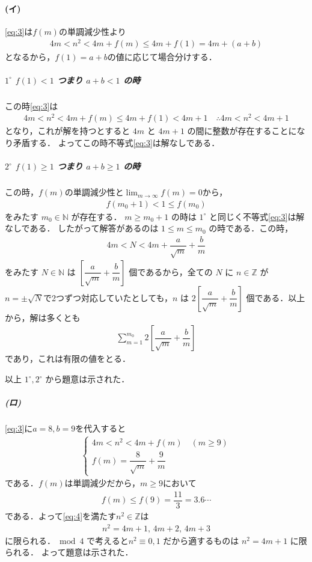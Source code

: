 \documentclass[../../main.tex]{subfiles}
\begin{document}
\paragraph{(イ)}

\cref{eq:3}は$f(m)$の単調減少性より
\begin{align}
  4m < n^2 < 4m + f(m) \le 4m + f(1) =4m+(a+b)
\end{align}
となるから，$f(1)=a+b$の値に応じて場合分けする．

\subparagraph{$1^\circ$ $f(1)<1$ つまり $a+b < 1$ の時}

この時\cref{eq:3}は
\begin{align}
  4m < n^2 < 4m + f(m) \le 4m + f(1) < 4m+1
  \quad\therefore
  4m < n^2 < 4m+1
\end{align}
となり，これが解を持つとすると $4m$ と $4m+1$ の間に整数が存在することになり矛盾する．
よってこの時不等式\cref{eq:3}は解なしである．

\subparagraph{$2^\circ$ $f(1)\ge 1$ つまり $a+b \ge 1$ の時}

この時，$f(m)$の単調減少性と$\lim_{m\to\infty}f(m)=0$から，
\begin{align}
  f(m_0+1) < 1 \le f(m_0)
\end{align}
をみたす $m_0 \in \mathbb{N}$ が存在する．
$m \ge m_0+1$ の時は $1^\circ$ と同じく不等式\cref{eq:3}は解なしである．
したがって解答があるのは $1 \le m \le m_0$ の時である．この時，
\begin{align}
  4m < N < 4m + \dfrac{a}{\sqrt{m}} + \dfrac{b}{m}
\end{align}
をみたす $N \in \mathbb{N}$ は $\left[ \dfrac{a}{\sqrt{m}} + \dfrac{b}{m} \right]$ 個であるから，全ての $N$ に $n \in \mathbb{Z}$ が $n=\pm\sqrt{N}$で2つずつ対応していたとしても，$n$ は $2 \left[ \dfrac{a}{\sqrt{m}} + \dfrac{b}{m} \right]$ 個である．以上から，解は多くとも
\begin{align}
  \sum_{m=1}^{m_0} 2 \left[ \dfrac{a}{\sqrt{m}} + \dfrac{b}{m} \right]
\end{align}
であり，これは有限の値をとる．
\casesend

以上 $1^\circ, 2^\circ$ から題意は示された．

\subparagraph{(ロ)}

\cref{eq:3}に$a=8,b=9$を代入すると
\begin{align}
  \begin{cases}
    4m < n^2 < 4m + f(m) \quad (m \ge 9)\\
    f(m) = \dfrac{8}{\sqrt{m}} + \dfrac{9}{m}
  \end{cases} \label{eq:4}
\end{align}
である．$f(m)$は単調減少だから，$m \ge 9$において
\begin{align}
  f(m) \le f(9) = \dfrac{11}{3} = 3.6\cdots
\end{align}
である．よって\cref{eq:4}を満たす$n^2 \in\mathbb{Z}$は
\begin{align}
  n^2 = 4m+1, \, 4m+2, \, 4m+3
\end{align}
に限られる．$\bmod 4$ で考えると$n^2 \equiv 0, 1$ だから適するものは $n^2 = 4m+1$ に限られる．
よって題意は示された．
\end{document}
